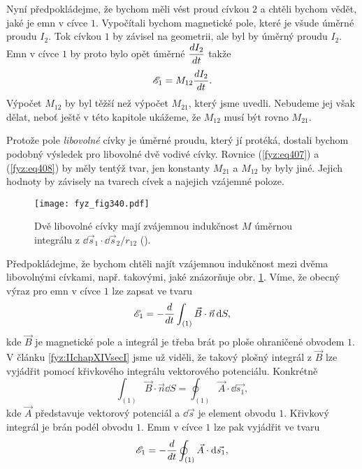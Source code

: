   Nyní předpokládejme, že bychom měli vést proud cívkou \(2\) a chtěli bychom vědět, jaké je emn v 
  cívce \(1\). Vypočítali bychom magnetické pole, které je všude úměrné proudu \(I_2\). Tok cívkou 
  \(1\) by závisel na geometrii, ale byl by úměrný proudu \(I_2\). Emn v cívce \(1\) by proto bylo 
  opět úměrné \(\dfrac{d I_2}{d t}\) takže
  \begin{equation}\label{fyz:eq408}
    \mathscr{E}_1 = M_{12}\dfrac{d I_2}{d t}.
  \end{equation}
  Výpočet \(M_{12}\) by byl těžší než výpočet \(M_{21}\), který jsme uvedli. Nebudeme jej však 
  dělat, neboť ještě v této kapitole ukážeme, že \(M_{12}\) musí být rovno \(M_{21}\).
  
  Protože pole \emph{libovolné} cívky je úměrné proudu, který jí protéká, dostali bychom podobný 
  výsledek pro libovolné dvě vodivé cívky. Rovnice (\ref{fyz:eq407}) a (\ref{fyz:eq408}) by měly 
  tentýž tvar, jen konstanty \(M_{21}\) a \(M_{12}\) by byly jiné. Jejich hodnoty by závisely na 
  tvarech cívek a najejich vzájemné poloze.
  
  \begin{figure}[ht!]  %
    \centering
    \texttt{[image: fyz\_fig340.pdf]}
    \caption{Dvě libovolné cívky mají zvájemnou indukčnost \(M\) úměrnou integrálu z 
            \(\dd{\vec{s}_1}\cdot\dd{\vec{s}_2}/r_{12}\)
             (\cite[s.~305]{Feynman02}).}
    \label{fyz:fig340}
  \end{figure}

  Předpokládejme, že bychom chtěli najít vzájemnou indukčnost mezi dvěma libovolnými cívkami, např. 
  takovými, jaké znázorňuje obr. \ref{fyz:fig340}. Víme, že obecný výraz pro emn v 
  cívce \(1\) lze zapsat ve tvaru
  \begin{equation}\label{fyz:eq409}
    \mathscr{E}_1 = - \dfrac{d  }{d t}\int_{(1)}\vec{B}\cdot\vec{n}\mathop{}\!\mathrm{d}S,
  \end{equation}
  kde \(\vec{B}\) je magnetické pole a integrál je třeba brát po ploše ohraničené obvodem \(1\). 
  V článku \ref{fyz:IIchapXIVsecI} jsme už viděli, že takový plošný integrál z \(\vec{B}\) lze 
  vyjádřit pomocí křivkového integrálu vektorového potenciálu. Konkrétně
  \begin{equation}\label{fyz:eq410}
    \int_{(1)}\vec{B}\cdot\vec{n}\dd{S} = \oint_{(1)}\vec{A}\cdot\dd{\vec{s_1}},
  \end{equation}
  kde \(\vec{A}\) představuje vektorový potenciál a \(\dd{\vec{s}}\) je element obvodu \(1\). 
  Křivkový integrál je brán podél obvodu \(1\). Emm v cívce \(1\) lze pak vyjádřit ve tvaru
  \begin{equation}\label{fyz:eq411}
    \mathscr{E}_1 = -\dfrac{d  }{d t}\oint_{(1)}\vec{A}\cdot\mathop{}\!\mathrm{d}\vec{s_1},
  \end{equation}
  
